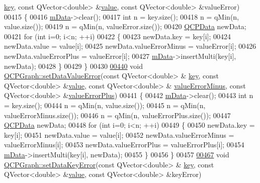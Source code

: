 \begin{DoxyCode}
      \hyperlink{a00116_a94bb892c30911cd62cba0707a5395be4}{key}, \textcolor{keyword}{const} QVector<double> &\hyperlink{a00116_aee90379adb0307effb138f4871edbc5c}{value}, \textcolor{keyword}{const} QVector<double> &valueError)
00415 \{
00416   \hyperlink{a00031_a8457c840f69a0ac49f61d30a509c5d08}{mData}->clear();
00417   \textcolor{keywordtype}{int} n = key.size();
00418   n = qMin(n, value.size());
00419   n = qMin(n, valueError.size());
00420   \hyperlink{a00030_d2/d94/a00184}{QCPData} newData;
00421   \textcolor{keywordflow}{for} (\textcolor{keywordtype}{int} i=0; i<n; ++i)
00422   \{
00423     newData.key = key[i];
00424     newData.value = value[i];
00425     newData.valueErrorMinus = valueError[i];
00426     newData.valueErrorPlus = valueError[i];
00427     \hyperlink{a00031_a8457c840f69a0ac49f61d30a509c5d08}{mData}->insertMulti(key[i], newData);
00428   \}
00429 \}
00430 
\hypertarget{a00115_source_l00440}{}\hyperlink{a00031_a3afbfd7222d739351c69387904776f93}{00440} \textcolor{keywordtype}{void} \hyperlink{a00031_acba6296eadcb36b93267628b8dae3de5}{QCPGraph::setDataValueError}(\textcolor{keyword}{const} QVector<double> &
      \hyperlink{a00116_a94bb892c30911cd62cba0707a5395be4}{key}, \textcolor{keyword}{const} QVector<double> &\hyperlink{a00116_aee90379adb0307effb138f4871edbc5c}{value}, \textcolor{keyword}{const} QVector<double> &
      \hyperlink{a00116_aea31bce613e569fc5e1888465c677909}{valueErrorMinus}, \textcolor{keyword}{const} QVector<double> &\hyperlink{a00116_a6d93a38079a2b52118982e82673e87a3}{valueErrorPlus})
00441 \{
00442   \hyperlink{a00031_a8457c840f69a0ac49f61d30a509c5d08}{mData}->clear();
00443   \textcolor{keywordtype}{int} n = key.size();
00444   n = qMin(n, value.size());
00445   n = qMin(n, valueErrorMinus.size());
00446   n = qMin(n, valueErrorPlus.size());
00447   \hyperlink{a00030_d2/d94/a00184}{QCPData} newData;
00448   \textcolor{keywordflow}{for} (\textcolor{keywordtype}{int} i=0; i<n; ++i)
00449   \{
00450     newData.key = key[i];
00451     newData.value = value[i];
00452     newData.valueErrorMinus = valueErrorMinus[i];
00453     newData.valueErrorPlus = valueErrorPlus[i];
00454     \hyperlink{a00031_a8457c840f69a0ac49f61d30a509c5d08}{mData}->insertMulti(key[i], newData);
00455   \}
00456 \}
00457 
\hypertarget{a00115_source_l00467}{}\hyperlink{a00031_abce9f07c0d722bc3e4fa7bd73c7e5dfa}{00467} \textcolor{keywordtype}{void} \hyperlink{a00031_abce9f07c0d722bc3e4fa7bd73c7e5dfa}{QCPGraph::setDataKeyError}(\textcolor{keyword}{const} QVector<double> &
      \hyperlink{a00116_a94bb892c30911cd62cba0707a5395be4}{key}, \textcolor{keyword}{const} QVector<double> &\hyperlink{a00116_aee90379adb0307effb138f4871edbc5c}{value}, \textcolor{keyword}{const} QVector<double> &keyError)

\end{DoxyCode}
